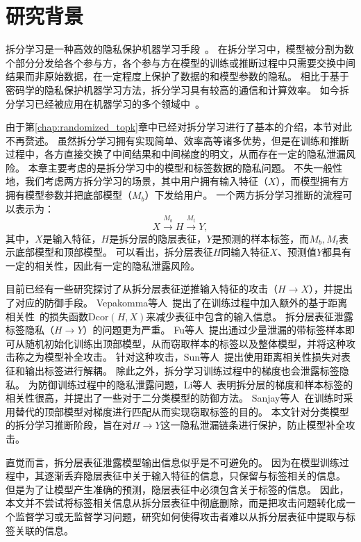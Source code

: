 \section{研究背景}
拆分学习是一种高效的隐私保护机器学习手段~\cite{vepakomma2018split,poirot2019split}。
在拆分学习中，模型被分割为数个部分分发给各个参与方，各个参与方在模型的训练或推断过程中只需要交换中间结果而非原始数据，在一定程度上保护了数据的和模型参数的隐私。
%
相比于基于密码学的隐私保护机器学习方法，拆分学习具有较高的通信和计算效率。
%
如今拆分学习已经被应用在机器学习的多个领域中~\cite{palanisamy2021spliteasy,fagbohungbe2022split_edge_image,ccc2022vfgnn}。

由于第\ref{chap:randomized_topk}章中已经对拆分学习进行了基本的介绍，本节对此不再赘述。
%
虽然拆分学习拥有实现简单、效率高等诸多优势，但是在训练和推断过程中，各方直接交换了中间结果和中间梯度的明文，从而存在一定的隐私泄漏风险。
%
本章主要考虑的是拆分学习中的模型和标签数据的隐私问题。
%
不失一般性地，我们考虑两方拆分学习的场景，其中用户拥有输入特征（$X$），而模型拥有方拥有模型参数并把底部模型（$M_b$）下发给用户。
一个两方拆分学习推断的流程可以表示为：
\begin{equation}
    X \stackrel{M_b}{\to} H \stackrel{M_t}{\to} Y,
\end{equation}
其中，$X$是输入特征，$H$是拆分层的隐层表征，$Y$是预测的样本标签，而$M_b, M_t$表示底部模型和顶部模型。
%
可以看出，拆分层表征$H$同输入特征$X$、预测值$Y$都具有一定的相关性，因此有一定的隐私泄露风险。


目前已经有一些研究探讨了从拆分层表征逆推输入特征的攻击（$H\to X$），并提出了对应的防御手段。
Vepakomma等人~\cite{vepakomma2020nopeek}提出了在训练过程中加入额外的基于距离相关性~\cite{szekely2007dcor}的损失函数$\text{Dcor}(H, X)$来减少表征中包含的输入信息。
%
拆分层表征泄露标签隐私（$H \to Y$）的问题更为严重。
%
Fu等人~\cite{fucong2022label_infer_attack}提出通过少量泄漏的带标签样本即可从随机初始化训练出顶部模型，从而窃取样本的标签以及整体模型，并将这种攻击称之为模型补全攻击。
%
针对这种攻击，Sun等人~\cite{sunjiankai2022forward_embedding_protect}提出使用距离相关性损失对表征和输出标签进行解耦。
%
除此之外，拆分学习训练过程中的梯度也会泄露标签隐私。
为防御训练过程中的隐私泄露问题，Li等人~\cite{oscarli2022label_defense_marvell}表明拆分层的梯度和样本标签的相关性很高，并提出了一些对于二分类模型的防御方法。
Sanjay等人~\cite{sanjay2023exploit_split_learning}在训练时采用替代的顶部模型对梯度进行匹配从而实现窃取标签的目的。
%
本文针对分类模型的拆分学习推断阶段，旨在对$H\to Y$这一隐私泄漏链条进行保护，防止模型补全攻击。

直觉而言，拆分层表征泄露模型输出信息似乎是不可避免的。
%
因为在模型训练过程中，其逐渐丢弃隐层表征中关于输入特征的信息，只保留与标签相关的信息。
但是为了让模型产生准确的预测，隐层表征中必须包含关于标签的信息。
%
因此，本文并不尝试将标签相关信息从拆分层表征中彻底删除，而是把攻击问题转化成一个监督学习或无监督学习问题，研究如何使得攻击者难以从拆分层表征中提取与标签关联的信息。
%
